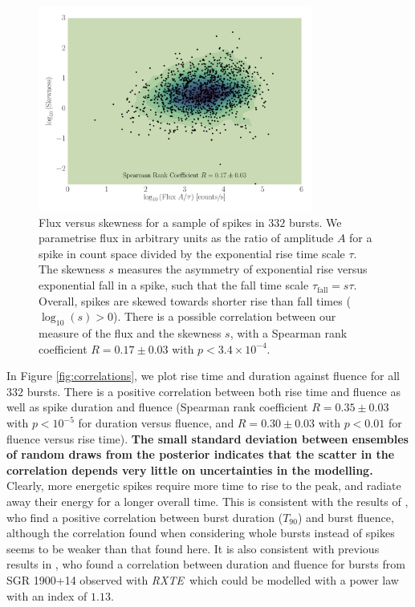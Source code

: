 \documentclass[12pt]{emulateapj}
\newcommand{\project}[1]{\textsl{#1}}
\newcommand{\rxte}{\project{RXTE}}
\begin{document}
\begin{figure}[htbp]
\begin{center}
\includegraphics[width=9cm]{f10.pdf}%
\caption{Flux versus skewness for a sample of spikes in $332$ bursts. We parametrise flux in arbitrary units as the ratio of amplitude $A$ 
for a spike in count space divided by the exponential rise time scale $\tau$. The skewness $s$ measures the asymmetry
of exponential rise versus exponential fall in a spike, such that the fall time scale $\tau_{\mathrm{fall}} = s\tau$. Overall, spikes are skewed towards shorter rise than fall times ($\log_{10}{(s)} > 0$). There is a possible correlation between our measure of the flux and the skewness $s$, with 
a Spearman rank coefficient $R = 0.17 \pm 0.03$ with $p < 3.4 \times 10^{-4}$.}
\label{fig:skewness}
\end{center}
\end{figure}


In Figure \ref{fig:correlations}, we plot rise time and duration against fluence for all $332$ bursts. There is a positive
correlation between both rise time and fluence as well as spike duration and fluence (Spearman rank coefficient $R = 0.35\pm0.03$ with $p < 10^{-5}$ for duration versus fluence,
and $R = 0.30\pm0.03$ with $p < 0.01$ for fluence versus rise time). {\bf The small standard deviation between ensembles of random draws from the posterior indicates that the scatter in the correlation depends very little on uncertainties in the modelling.} Clearly, more energetic spikes require more time to rise to the peak,
and radiate away their energy for a longer overall time. This is consistent with the results of \citet{vanderhorst2012}, who find a positive correlation between burst duration ($T_{90}$)
and burst fluence, although the correlation found when considering whole bursts instead of spikes seems to be weaker than that found here. It is also consistent with 
previous results in \citet{gogus1999}, who found a correlation between
duration and fluence for bursts from SGR 1900+14 observed with \rxte\, which could be modelled with a power law with an index of $1.13$. 
\end{document}
